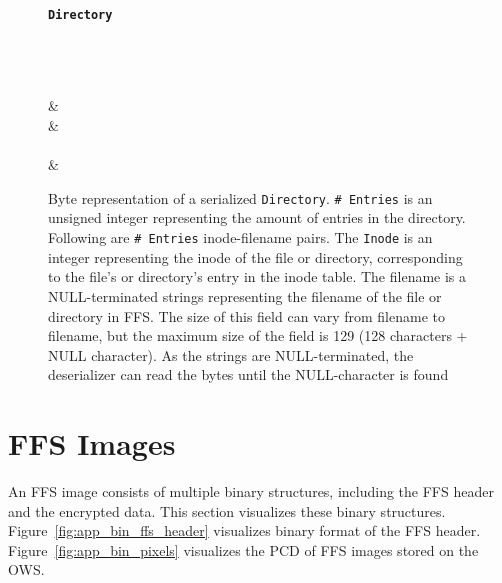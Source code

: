 \begin{figure}[!htb]
	\label{fig:app_bin_dir}
	\centering
    \textbf{\texttt{Directory}}\par\medskip

	\begin{bytefield}[bitwidth=0.0625\textwidth]{16}
		 \\
		 \\
		 \\
		 & \\
		 & \\
		 \\[1ex]
		 & \\
	\end{bytefield}
	\caption[Byte representation of the serialization of an \texttt{Directory} object]{Byte representation of a serialized \texttt{Directory}. \texttt{\#~Entries} is an unsigned integer representing the amount of entries in the directory. Following are \texttt{\#~Entries} \mbox{inode-filename} pairs. The \texttt{Inode} is an integer representing the inode of the file or directory, corresponding to the file's or directory's entry in the inode table. The filename is a \mbox{NULL-terminated} strings representing the filename of the file or directory in \gls{FFS}. The size of this field can vary from filename to filename, but the maximum size of the field is \SI{129}{\byte} (128 characters + NULL character). As the strings are \mbox{NULL-terminated}, the deserializer can read the bytes until the \mbox{NULL-character} is found}
\end{figure}

\section{FFS Images}
An \gls{FFS} image consists of multiple binary structures, including the \gls{FFS} header and the encrypted data. This section visualizes these binary structures. Figure~\ref{fig:app_bin_ffs_header} visualizes binary format of the \gls{FFS} header. Figure~\ref{fig:app_bin_pixels} visualizes the \gls{PCD} of \gls{FFS} images stored on the \gls{OWS}.

